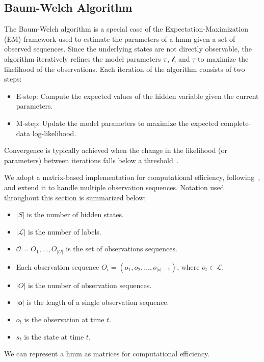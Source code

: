 \subsection{Baum-Welch Algorithm}\label{subsec:baum-welch}
The Baum-Welch algorithm is a special case of the Expectation-Maximization (EM) framework used to estimate the parameters of a \gls{hmm} given a set of observed sequences.
Since the underlying states are not directly observable, the algorithm iteratively refines the model parameters $\pi$, $\mathscr{l}$, and $\tau$ to maximize the likelihood of the observations.
Each iteration of the algorithm consists of two steps:
\begin{itemize}
    \item E-step: Compute the expected values of the hidden variable given the current parameters.
    \item M-step: Update the model parameters to maximize the expected complete-data log-likelihood.
\end{itemize}

Convergence is typically achieved when the change in the likelihood (or parameters) between iterations falls below a threshold~\cite{Rabiner89}.


We adopt a matrix-based implementation for computational efficiency, following~\cite{aaholmbaum}, and extend it to handle multiple observation sequences.
Notation used throughout this section is summarized below:

\begin{itemize}
    \item $|S|$ is the number of hidden states.
    \item $|\mathcal{L}|$ is the number of labels.
    \item $\mathcal{O} = {O_1, \ldots, O_{|\mathcal{O}|}}$  is the set of observations sequences.
    \item Each observation sequence $O_i = (o_{1}, o_{2}, \ldots, o_{|o|-1 })$, where $o_{t} \in \mathcal{L}$.
    \item $|O|$ is the number of observation sequences.
    \item $|\mathbf{o}|$ is the length of a single observation sequence.
    \item $o_t$ is the observation at time $t$.
    \item $s_t$ is the state at time $t$.
\end{itemize}

We can represent a \gls{hmm} as matrices for computational efficiency.

